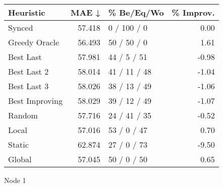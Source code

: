\begin{tabular}{lrlr}
\toprule
\textbf{Heuristic} & \textbf{MAE ↓} & \textbf{\% Be/Eq/Wo} & \textbf{\% Improv.} \\
\midrule
            Synced &         57.418 &          0 / 100 / 0 &                0.00 \\
     Greedy Oracle &         56.493 &          50 / 50 / 0 &                1.61 \\
         Best Last &         57.981 &          44 / 5 / 51 &               -0.98 \\
       Best Last 2 &         58.014 &         41 / 11 / 48 &               -1.04 \\
       Best Last 3 &         58.026 &         38 / 13 / 49 &               -1.06 \\
    Best Improving &         58.029 &         39 / 12 / 49 &               -1.07 \\
            Random &         57.716 &         24 / 41 / 35 &               -0.52 \\
             Local &         57.016 &          53 / 0 / 47 &                0.70 \\
            Static &         62.874 &          27 / 0 / 73 &               -9.50 \\
            Global &         57.045 &          50 / 0 / 50 &                0.65 \\
\bottomrule
\end{tabular}
\caption{Node 1}
\label{tab:non_lr05_le2_bs4_1}
